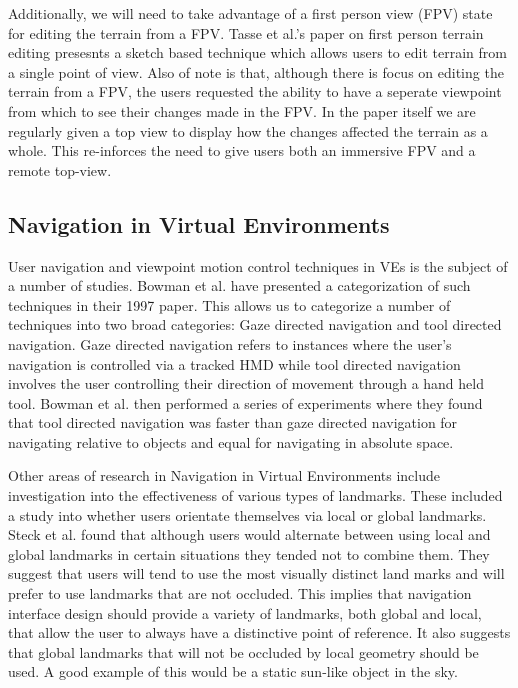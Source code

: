 \documentclass{sig-alternate-05-2015}
\begin{document}
Additionally, we will need to take advantage of a first person view (FPV) state for editing the terrain from a FPV. Tasse et al.'s paper on first person terrain editing presesnts a sketch based technique which allows users to  edit terrain from a single point of view\cite{Tasse2014}. Also of note is that, although there is focus on editing the terrain from a FPV, the users requested the ability to have a seperate viewpoint from which to see their changes made in the FPV. In the paper itself we are regularly given a top view to display how the changes affected the terrain as a whole. This re-inforces the need to give users both an immersive FPV and a remote top-view.
\subsection{Navigation in Virtual Environments}
User navigation and viewpoint motion control techniques in VEs is the subject of a number of studies. Bowman et al. have presented a categorization of such techniques in their 1997 paper\cite{Bowman1997}. This allows us to categorize a number of techniques into two broad categories: Gaze directed navigation and tool directed navigation. Gaze directed navigation refers to instances where the user's navigation is controlled via a tracked HMD while tool directed navigation involves the user controlling their direction of movement through a hand held tool. Bowman et al. then performed a series of experiments where they found that tool directed navigation was faster than gaze directed navigation for navigating relative to objects and equal for navigating in absolute space.

Other areas of research in Navigation in Virtual Environments include investigation into the effectiveness of various types of landmarks. These included a study into whether users orientate themselves via local or global landmarks\cite{Steck2000}. Steck et al. found that although users would alternate between using local and global landmarks in certain situations they tended not to combine them. They suggest that users will tend to use the most visually distinct land marks and will prefer to use landmarks that are not occluded. This implies that navigation interface design should provide a variety of landmarks, both global and local, that allow the user to always have a distinctive point of reference. It also suggests that global landmarks that will not be occluded by local geometry should be used. A good example of this would be a static sun-like object in the sky.
\end{document}
